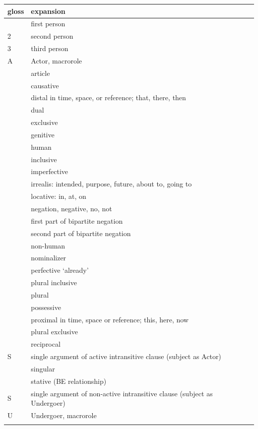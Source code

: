 {\wg
\begin{xltabular}{\textwidth}[l]{l>{\raggedright\arraybackslash}p{5cm}>{\raggedright\arraybackslash}X}
\lsptoprule
	gloss	&	expansion	\\ \midrule \hhline{~}
	&	first person	\\	
2	&	second person	\\	
3	&	third person	\\	
A	&	Actor, macrorole	\\	
	&	article	\\	
	&	causative	\\	
	&	distal in time, space, or reference; that, there, then	\\	
	&	dual	\\	
	&	exclusive	\\	
	&	genitive	\\	
	&	human 	\\	
	&	inclusive	\\	
	&	imperfective	\\	
	&	irrealis: intended, purpose, future, about to, going to	\\	
	&	locative: in, at, on	\\	
	&	negation, negative, no, not	\\	
	&	first part of bipartite negation	\\	
	&	second part of bipartite negation	\\	
	&	non-human 	\\	
	&	nominalizer	\\	
	&	perfective ‘already’	\\	
	&	plural inclusive	\\	
	&	plural 	\\	
	&	possessive	\\	
	&	proximal in time, space or reference; this, here, now	\\	
	&	plural exclusive	\\	
	&	reciprocal	\\	
S	&	single argument of active intransitive clause (subject as Actor)	\\	
	&	singular 	\\	
	&	stative (BE relationship)	\\	
S	&	single argument of non-active intransitive clause (subject as Undergoer)	\\	
U	&	Undergoer, macrorole	\\	\lspbottomrule
\end{xltabular}}

